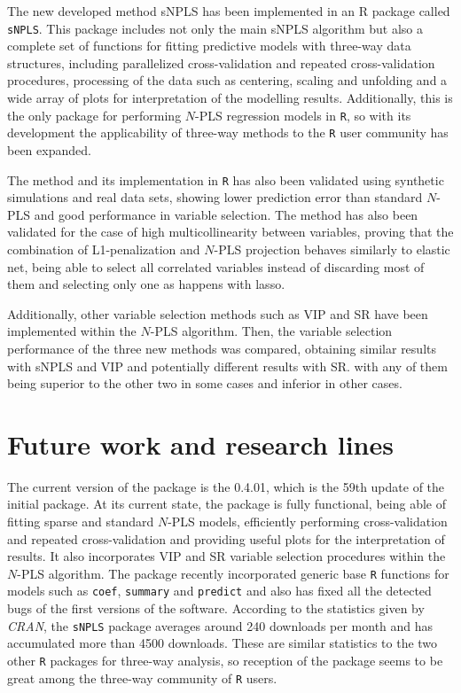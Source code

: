 The new developed method sNPLS has been implemented in an R package called \texttt{sNPLS}. This package includes not only the main sNPLS algorithm but also a complete set of functions for fitting predictive models with three-way data structures, including parallelized cross-validation and repeated cross-validation procedures, processing of the data such as centering, scaling and unfolding and a wide array of plots for interpretation of the modelling results. Additionally, this is the only package for performing $N$-PLS regression models in \texttt{R}, so with its development the applicability of three-way methods to the \texttt{R} user community has been expanded.

The method and its implementation in \texttt{R} has also been validated using synthetic simulations and real data sets, showing lower prediction error than standard $N$-PLS and good performance in variable selection. The method has also been validated for the case of high multicollinearity between variables, proving that the combination of L1-penalization and $N$-PLS projection behaves similarly to elastic net, being able to select all correlated variables instead of discarding most of them and selecting only one as happens with lasso. 

Additionally, other variable selection methods such as VIP and SR have been implemented within the $N$-PLS algorithm. Then, the  variable selection performance of the three new methods was compared, obtaining similar results with sNPLS and VIP and potentially different results with SR. with any of them being superior to the other two in some cases and inferior in other cases.

\section{Future work and research lines}
\label{packagedev}
The current version of the package is the 0.4.01, which is the 59th update of the initial package. At its current state, the package is fully functional, being able of fitting sparse and standard $N$-PLS models, efficiently performing cross-validation and repeated cross-validation and providing useful plots for the interpretation of results. It also incorporates VIP and SR variable selection procedures within the $N$-PLS algorithm. The package recently incorporated generic base \texttt{R} functions for models such as \texttt{coef}, \texttt{summary} and \texttt{predict} and also has fixed all the detected bugs of the first versions of the software. According to the statistics given by \textit{CRAN}, the \texttt{sNPLS} package averages around 240 downloads per month and has accumulated more than 4500 downloads. These are similar statistics to the two other \texttt{R} packages for three-way analysis, so reception of the package seems to be great among the three-way community of \texttt{R} users.

